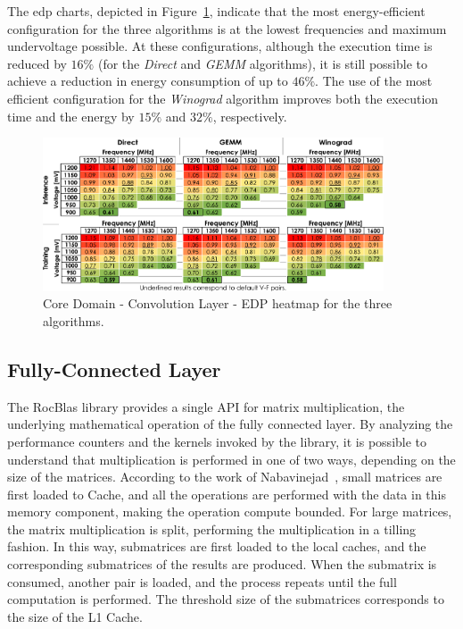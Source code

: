 The \acrshort{edp} charts, depicted in Figure~\ref{fig:Convolution_EDP}, indicate that the most energy-efficient configuration for the three algorithms is at the lowest frequencies and maximum undervoltage possible. At these configurations, although the execution time is reduced by $16\%$ (for the \textit{Direct} and \textit{GEMM} algorithms), it is still possible to achieve a reduction in energy consumption of up to $46\%$. The use of the most efficient configuration for the \textit{Winograd} algorithm improves both the execution time and the energy by $15\%$ and $32\%$, respectively.

\begin{figure}[htbp]
    \centering
        \includegraphics[width=0.9\textwidth]{Figures/Application To Deep Learning/Convolution_EDP.pdf}
        \caption{Core Domain - Convolution Layer - EDP heatmap for the three algorithms.}
    \label{fig:Convolution_EDP}
\end{figure}



\subsection{Fully-Connected Layer}


The RocBlas library provides a single API for matrix multiplication, the underlying mathematical operation of the fully connected layer. By analyzing the performance counters and the kernels invoked by the library, it is possible to understand that multiplication is performed in one of two ways, depending on the size of the matrices.
According to the work of Nabavinejad~\cite{dutot_high-performance_2016}, small matrices are first loaded to Cache, and all the operations are performed with the data in this memory component, making the operation compute bounded. For large matrices, the matrix multiplication is split, performing the multiplication in a tilling fashion. In this way, submatrices are first loaded to the local caches, and the corresponding submatrices of the results are produced. When the submatrix is consumed, another pair is loaded, and the process repeats until the full computation is performed. The threshold size of the submatrices corresponds to the size of the L1 Cache. 


